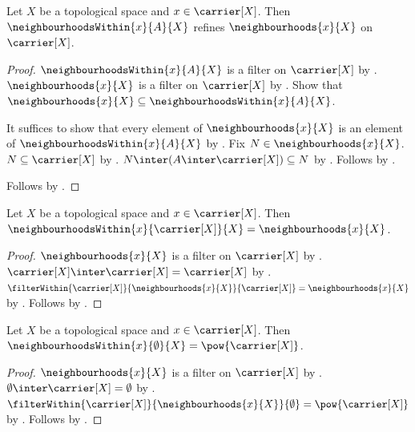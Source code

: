 \begin{proposition}\label{neighbourhoods_within_refines_neighbourhoods}
    Let $X$ be a topological space and $x\in\carrier[X]$.
    Then $\neighbourhoodsWithin{x}{A}{X}$ refines
        $\neighbourhoods{x}{X}$ on $\carrier[X]$.
\end{proposition}
\begin{proof}
    $\neighbourhoodsWithin{x}{A}{X}$ is a filter on $\carrier[X]$ by
        .
    $\neighbourhoods{x}{X}$ is a filter on $\carrier[X]$ by
        .
    Show that $\neighbourhoods{x}{X}
        \subseteq\neighbourhoodsWithin{x}{A}{X}$.
    \begin{subproof}
        It suffices to show that every element of $\neighbourhoods{x}{X}$
            is an element of $\neighbourhoodsWithin{x}{A}{X}$ by
            .
        Fix $N\in\neighbourhoods{x}{X}$.
        $N\subseteq\carrier[X]$ by .
        $N\inter(A\inter\carrier[X])\subseteq N$ by
            .
        Follows by .
    \end{subproof}
    Follows by .
\end{proof}

\begin{proposition}\label{neighbourhoods_within_carrier}
    Let $X$ be a topological space and $x\in\carrier[X]$.
    Then $\neighbourhoodsWithin{x}{\carrier[X]}{X}
        =\neighbourhoods{x}{X}$.
\end{proposition}
\begin{proof}
    $\neighbourhoods{x}{X}$ is a filter on $\carrier[X]$ by
        .
    $\carrier[X]\inter\carrier[X]=\carrier[X]$ by
        .
    $\filterWithin{\carrier[X]}{\neighbourhoods{x}{X}}{\carrier[X]}
        =\neighbourhoods{x}{X}$ by .
    Follows by .
\end{proof}

\begin{proposition}\label{neighbourhoods_within_emptyset}
    Let $X$ be a topological space and $x\in\carrier[X]$.
    Then $\neighbourhoodsWithin{x}{\emptyset}{X}
        =\pow{\carrier[X]}$.
\end{proposition}
\begin{proof}
    $\neighbourhoods{x}{X}$ is a filter on $\carrier[X]$ by
        .
    $\emptyset\inter\carrier[X]=\emptyset$ by
        .
    $\filterWithin{\carrier[X]}{\neighbourhoods{x}{X}}{\emptyset}
        =\pow{\carrier[X]}$ by .
    Follows by .
\end{proof}


